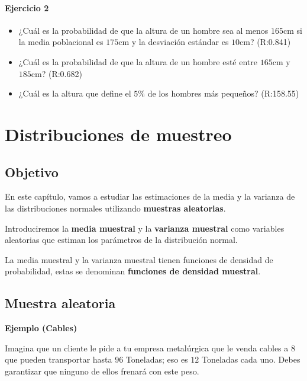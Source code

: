 \documentclass[
]{book}
\begin{document}
\hypertarget{ejercicio-2-6}{%
\subsubsection{Ejercicio 2}\label{ejercicio-2-6}}

\begin{itemize}
\item
  ¿Cuál es la probabilidad de que la altura de un hombre sea al menos
  \(165\)cm si la media poblacional es \(175\)cm y la desviación estándar es \(10\)cm? (R:0.841)
\item
  ¿Cuál es la probabilidad de que la altura de un hombre esté entre
  \(165\)cm y \(185\)cm? (R:0.682)
\item
  ¿Cuál es la altura que define el \(5\%\) de los hombres más pequeños? (R:158.55)
\end{itemize}

\hypertarget{distribuciones-de-muestreo}{%
\chapter{Distribuciones de muestreo}\label{distribuciones-de-muestreo}}

\hypertarget{objetivo-6}{%
\section{Objetivo}\label{objetivo-6}}

En este capítulo, vamos a estudiar las estimaciones de la media y la varianza de las distribuciones normales utilizando \textbf{muestras aleatorias}.

Introduciremos la \textbf{media muestral} y la \textbf{varianza muestral} como variables aleatorias que estiman los parámetros de la distribución normal.

La media muestral y la varianza muestral tienen funciones de densidad de probabilidad, estas se denominan \textbf{funciones de densidad muestral}.

\hypertarget{muestra-aleatoria}{%
\section{Muestra aleatoria}\label{muestra-aleatoria}}

\textbf{Ejemplo (Cables)}

Imagina que un cliente le pide a tu empresa metalúrgica que le venda cables a \(8\) que pueden transportar hasta \(96\) Toneladas; eso es \(12\) Toneladas cada uno. Debes garantizar que ninguno de ellos frenará con este peso.
\end{document}
